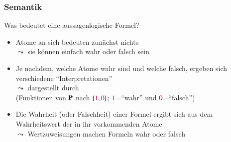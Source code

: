 \documentclass[onlymath]{beamer}
\begin{document}
\begin{frame}\frametitle{Semantik}

\alert{Was bedeutet eine aussagenlogische Formel?}\pause
\begin{itemize}
\item Atome an sich bedeuten zunächst nichts\\
$\leadsto$ sie können einfach wahr oder falsch sein\pause
\item Je nachdem, welche Atome wahr sind und welche falsch, ergeben sich verschiedene "`Interpretationen"'\\
$\leadsto$ dargestellt durch \\
\mbox{}\phantom{$\leadsto$} (Funktionen von $\textbf{\textcolor{black}{P}}$ nach $\{\textcolor{purple}{1},\textcolor{purple}{0}\}$; $\textcolor{purple}{1}$="`wahr"' und $\textcolor{purple}{0}$="`falsch"')\pause
\item Die Wahrheit (oder Falschheit) einer Formel ergibt sich aus dem Wahrheitswert der in ihr vorkommenden Atome\\
$\leadsto$ Wertzuweisungen machen Formeln wahr oder falsch
\end{itemize}


\end{frame}
\end{document}
